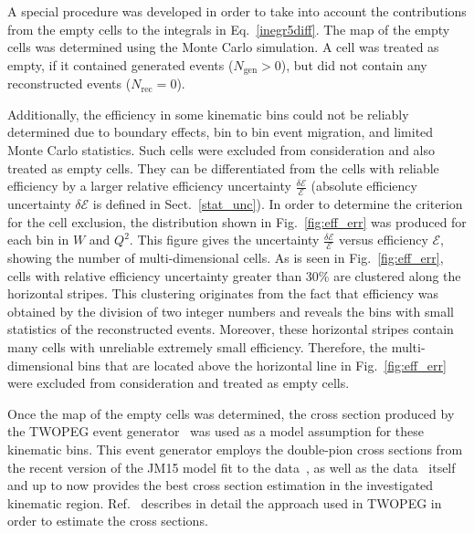 \documentclass[prc,twocolumn,superscriptaddress,showpacs,amssymb,amsmath,amsfonts,aps,nofootinbib]{revtex4-1}
\begin{document}
A special procedure was developed in order to take into account the contributions from the empty cells to the integrals in Eq.~\eqref{inegr5diff}.
The map of the empty cells was determined using the Monte Carlo simulation. A cell was treated as empty, if it contained generated events ($N_{\text{gen}} > 0$), but did not contain any reconstructed events ($N_{\text{rec}} = 0$). 

Additionally, the efficiency in some kinematic bins could not be reliably determined due to boundary effects, bin to bin event migration, and limited Monte Carlo statistics.  
Such cells were excluded from consideration and also treated as empty cells.
They can be differentiated from the cells with reliable efficiency by a larger relative efficiency uncertainty $\frac{\delta \mathcal{E}}{\mathcal{E}}$ (absolute efficiency uncertainty $\delta \mathcal{E}$ is defined in Sect.~\ref{stat_unc}).
In order to determine the criterion for the cell exclusion, the distribution shown in Fig.~\ref{fig:eff_err} was produced for each bin in $W$ and $Q^{2}$.
This figure gives the uncertainty $\frac{\delta \mathcal{E}}{\mathcal{E}}$   versus efficiency $\mathcal{E}$, showing the number of multi-dimensional cells. As is seen in  Fig.~\ref{fig:eff_err}, cells with relative efficiency uncertainty greater than 30\% are clustered along the horizontal stripes. This clustering originates from the fact that efficiency was obtained by the division of two integer numbers and reveals the bins with small statistics of the reconstructed events. Moreover, these horizontal stripes contain many cells with unreliable extremely small efficiency. Therefore,  the multi-dimensional bins that are located above the horizontal  line in Fig.~\ref{fig:eff_err} were excluded from consideration and treated as empty cells.



Once the map of the empty cells was determined, the cross section produced by the TWOPEG event  generator~\cite{Skorodum:EG} was used as a model assumption for these kinematic bins. This event generator employs the double-pion cross sections from the recent version of the JM15 model fit to the data~\cite{Ripani:2002ss,Mokeev:2012vsa,Fedotov:2008aa,Golovach:note}, as well as the data~\cite{Wu:2005wf,ABBHHM:1968aa} itself and up to now provides the best cross section estimation in the investigated kinematic region.
Ref.~\cite{Skorodum:EG} describes in detail the approach used in TWOPEG in order to estimate the cross sections. 
\end{document}
